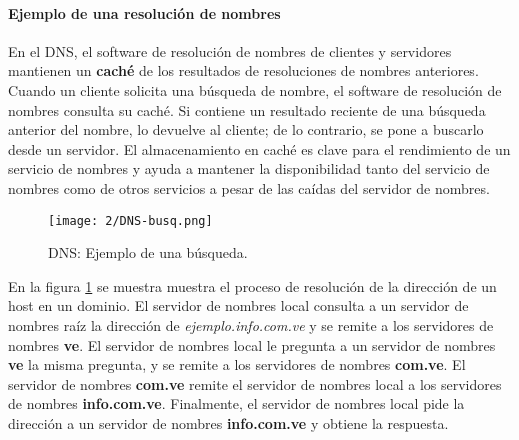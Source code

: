 
\paragraph{Ejemplo de una resolución de nombres}

En el DNS,  el software de resolución de nombres de clientes y  servidores mantienen un \textbf{caché} de los resultados de resoluciones de nombres anteriores. Cuando un cliente solicita una búsqueda de nombre, el software de resolución de nombres consulta su caché. Si contiene un resultado reciente de una búsqueda anterior del nombre, lo devuelve al cliente; de lo contrario, se pone a buscarlo desde un servidor. El almacenamiento en caché es clave para el rendimiento de un servicio de nombres y ayuda a mantener la disponibilidad tanto del servicio de nombres como de otros servicios a pesar de las caídas del servidor de nombres.
\begin{figure}									
	\texttt{[image: 2/DNS-busq.png]}		
	\caption{DNS: Ejemplo de una búsqueda. }
	\label{fig:DNS-busq} 		
\end{figure}


En la figura \ref{fig:DNS-busq} se muestra  muestra el proceso de resolución de la dirección de un host  en un dominio. El servidor de nombres local consulta a un servidor de nombres raíz la dirección de \textit{ejemplo.info.com.ve} y se remite a los servidores de nombres \textbf{ve}. El servidor de nombres local le pregunta a un servidor de nombres \textbf{ve} la misma pregunta, y se remite a los servidores de nombres \textbf{com.ve}. El servidor de nombres \textbf{com.ve} remite el servidor de nombres local a los servidores de nombres \textbf{info.com.ve}. Finalmente, el servidor de nombres local
pide la dirección a un servidor de nombres \textbf{info.com.ve} y obtiene la respuesta.

	






